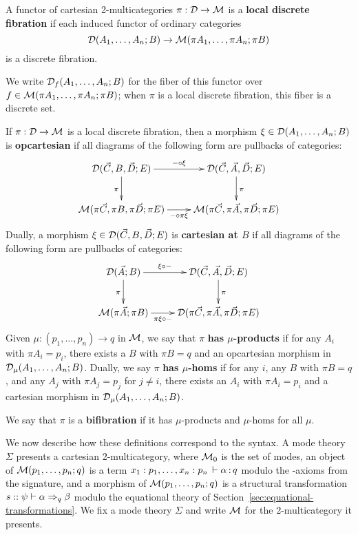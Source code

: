 \begin{definition}
  A functor of cartesian 2-multicategories $\pi:\mathcal{D}\to\mathcal{M}$ is a \textbf{local discrete fibration} if each induced functor of ordinary categories
  \[\mathcal{D}(A_1,\dots,A_n;B)\to\mathcal{M}(\pi A_1,\dots,\pi A_n;\pi B)\]
  is a discrete fibration.
\end{definition}

We write $\mathcal{D}_f(A_1,\dots,A_n;B)$ for the fiber of this functor over
$f\in \mathcal{M}(\pi A_1,\dots,\pi A_n;\pi B)$; when $\pi$ is a local discrete
fibration, this fiber is a discrete set.

\begin{definition}
  If $\pi:\mathcal{D}\to\mathcal{M}$ is a local discrete fibration, then a morphism $\xi\in\mathcal{D}(A_1,\dots,A_n;B)$ is \textbf{opcartesian} if all diagrams of the following form are pullbacks of categories:
  \[ \xymatrix{
    \cD(\vec C,B,\vec D;E) \ar[r]^-{-\circ \xi} \ar[d]_\pi &
    \cD(\vec C,\vec A,\vec D;E) \ar[d]^\pi \\
    \M(\pi\vec C,\pi B, \pi\vec D; \pi E) \ar[r]_-{-\circ \pi\xi} &
    \M(\pi\vec C,\pi\vec A,\pi\vec D;\pi E)
  }\]
  Dually, a morphism $\xi\in\mathcal{D}(\vec C,B,\vec D;E)$ is \textbf{cartesian at $B$} if all diagrams of the following form are pullbacks of categories:
  \[ \xymatrix{
    \cD(\vec A;B) \ar[r]^-{\xi\circ -} \ar[d]_\pi &
    \cD(\vec C,\vec A,\vec D;E) \ar[d]^\pi \\
    \M(\pi\vec A;\pi B) \ar[r]_-{\pi\xi\circ -} &
    \cD(\pi\vec C,\pi\vec A,\pi\vec D;\pi E)
  }\]
  Given $\mu:(p_1,\dots,p_n) \to q$ in $\mathcal{M}$, we say that $\pi$ \textbf{has $\mu$-products} if for any $A_i$ with $\pi A_i = p_i$, there exists a $B$ with $\pi B = q$ and an opcartesian morphism in $\mathcal{D}_\mu(A_1,\dots,A_n;B)$.
  Dually, we say $\pi$ \textbf{has $\mu$-homs} if for any $i$, any $B$ with $\pi B = q$, and any $A_j$ with $\pi A_j = p_j$ for $j\neq i$, there exists an $A_i$ with $\pi A_i = p_i$ and a cartesian morphism in $\mathcal{D}_\mu(A_1,\dots,A_n;B)$.

  We say that $\pi$ is a \textbf{bifibration} if it has $\mu$-products
  and $\mu$-homs for all $\mu$.
\end{definition}

We now describe how these definitions correspond to the syntax.  A mode
theory $\Sigma$ presents a cartesian 2-multicategory, where $\mathcal{M}_0$ is
the set of modes, an object of $\mathcal{M}(p_1,\ldots,p_n;q)$ is a term
$x_1:p_1,\ldots,x_n:p_n \, \vdash \alpha \, \mathit{:} \, q$ modulo the \deq-axioms from
the signature, and a morphism of $\mathcal{M}(p_1,\ldots,p_n;q)$ is a structural
transformation $s :: \psi \vdash \alpha \Rightarrow_{q} \beta$ modulo the
equational theory of Section~\ref{sec:equational-transformations}.  We
fix a mode theory $\Sigma$ and write $\mathcal{M}$ for the 2-multicategory it
presents.

